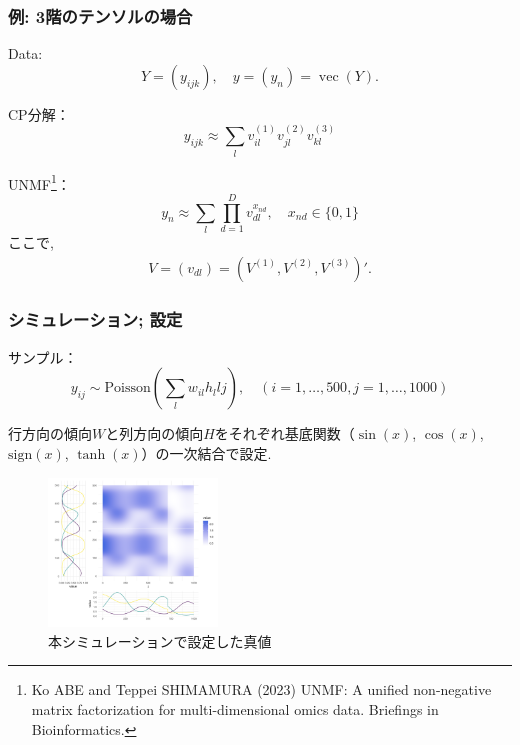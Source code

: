 \documentclass[dvipdfmx, dvipsnames]{beamer}
\begin{document}
\begin{frame}[noframenumbering]
\frametitle{例: 3階のテンソルの場合}
Data:
$$
 Y=(y_{ijk}), \quad y=(y_n) = \operatorname{vec}(Y) .
$$

CP分解：
\begin{equation*}
y_{ijk} \approx \sum_{l}v_{il}^{(1)} v_{jl}^{(2)} v_{kl}^{(3)}
\end{equation*}

UNMF\footnote{Ko ABE and Teppei SHIMAMURA (2023) UNMF: A unified non-negative matrix factorization for multi-dimensional omics data. Briefings in Bioinformatics. }：
\begin{equation*}
y_{n} \approx \sum_{l}\prod_{d=1}^D v_{dl}^{x_{nd}},  \quad x_{nd} \in \{0,1\}
\end{equation*}
ここで, 
\begin{align*}
V = (v_{dl}) = \left(V^{(1)} , V^{(2)} , V^{(3)}\right)'.
\end{align*}
\end{frame}

\begin{frame}[noframenumbering]
\frametitle{シミュレーション; 設定}

サンプル：
$$
y_{ij} \sim \mathrm{Poisson}\left(\sum_{l} w_{il}h_l{lj} \right), \quad  (i=1,\ldots,500, j=1,\ldots, 1000)
$$

行方向の傾向$W$と列方向の傾向$H$をそれぞれ基底関数（$\sin(x)$, $\cos(x)$, $\mathrm{sign}(x)$, $\tanh(x)$）の一次結合で設定.

\begin{figure}
\includegraphics[width=0.4\textwidth]{img/groundtruth.pdf}
\caption{本シミュレーションで設定した真値}
\end{figure}
\end{frame}
\end{document}
